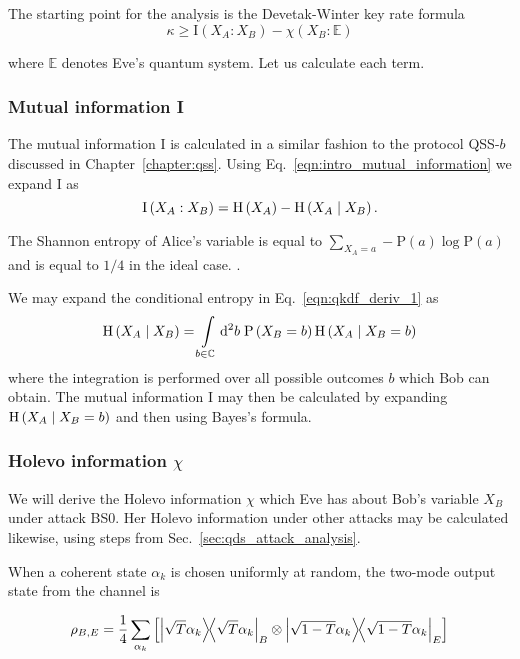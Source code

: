 The starting point for the analysis is the Devetak-Winter key rate formula \cite{Devetak2004} 
\begin{equation}
\kappa \ge \text{I}\left(X_A : X_B\right) - \chi\left(X_B : \mathbb{E}\right)
\end{equation}

\noindent where $\mathbb{E}$ denotes Eve's quantum system. Let us calculate each term.

\subsubsection{Mutual information I}
The mutual information I is calculated in a similar fashion to the protocol QSS-$b$ discussed in Chapter~\ref{chapter:qss}. Using Eq.~\ref{eqn:intro_mutual_information} we expand $\text{I}$ as
\begin{equation}\label{eqn:qkdf_deriv_1}
\text{I}\left(X_A : X_B\right) = \text{H}\left(X_A\right) - \text{H}\left(X_A \; \middle| \; X_B\right).
\end{equation}

\noindent The Shannon entropy of Alice's variable is equal to $\sum_{X_A=a} - \text{P}\left(a\right) \log \text{P}\left(a\right)$ and is equal to $1/4$ in the ideal case. .

We may expand the conditional entropy in Eq.~\ref{eqn:qkdf_deriv_1} as
\begin{equation}\label{eqn:qkdf_deriv_2}
\text{H}\left(X_A \; \middle| \; X_B\right) = \int\limits_{b \in \mathbb{C}} \mathop{}\!\mathrm{d^2} b \; \text{P}\left(X_B=b\right) \text{H}\left(X_A \; \middle| \; X_B=b\right)
\end{equation}
where the integration is performed over all possible outcomes $b$ which Bob can obtain. The mutual information I may then be calculated by expanding $\text{H}\left(X_A \; \middle| \; X_B=b\right)$ and then using Bayes's formula. 

\subsubsection{Holevo information $\chi$}
We will derive the Holevo information $\chi$ which Eve has about Bob's variable $X_B$ under attack BS$0$. Her Holevo information under other attacks may be calculated likewise, using steps from Sec.~\ref{sec:qds_attack_analysis}.

When a coherent state $\alpha_k$ is chosen uniformly at random, the two-mode output state from the channel is

\begin{equation}
\rho_{B, E} = \frac{1}{4} \sum_{\alpha_k} \left[ \dyad{\sqrt{T}\alpha_k}_B \otimes \dyad{\sqrt{1-T}\alpha_k}_E\right]
\end{equation}

